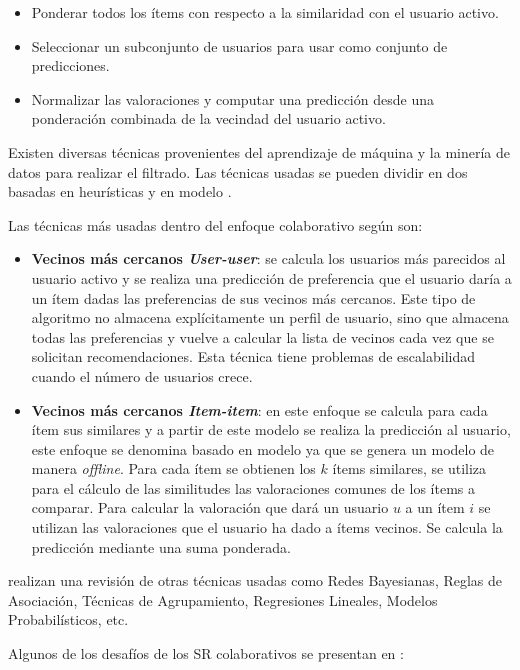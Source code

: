 \begin{itemize}
\item Ponderar todos los ítems con respecto a la similaridad con el usuario activo.
\item Seleccionar un subconjunto de usuarios para usar como conjunto de predicciones.
\item Normalizar las valoraciones y computar una predicción desde una ponderación combinada de la vecindad del usuario activo.
\end{itemize}

Existen diversas técnicas provenientes del aprendizaje de máquina y la minería de datos para realizar el filtrado. Las técnicas usadas se pueden dividir en dos basadas en heurísticas y en modelo \citep{Adomavicius:2005}.

Las técnicas más usadas dentro del enfoque colaborativo según \citep{Bobadilla:2013} son:
\begin{itemize}
\item \textbf{Vecinos más cercanos \textit{User-user}}: se calcula los usuarios más parecidos al usuario activo y se realiza una predicción de preferencia que el usuario daría a un ítem dadas las preferencias de sus vecinos más cercanos. Este tipo de algoritmo no almacena explícitamente un perfil de usuario, sino que almacena todas las preferencias y vuelve a calcular la lista de vecinos cada vez que se solicitan recomendaciones. Esta técnica  tiene problemas de escalabilidad cuando el número de usuarios crece.

\item \textbf{Vecinos más cercanos \textit{Item-item}}: en este enfoque se calcula para cada ítem sus similares y a partir de este modelo se realiza la predicción al usuario, este enfoque se denomina basado en modelo ya que se genera un modelo de manera \textit{offline}. Para cada ítem se obtienen los $k$ ítems similares, se utiliza para el cálculo de las similitudes las valoraciones comunes de los ítems a comparar. Para calcular la valoración que dará un usuario $u$ a un ítem $i$ se utilizan las valoraciones que el usuario ha dado a ítems vecinos. Se calcula la predicción mediante una suma ponderada.
\end{itemize}

\cite{Su:2009} realizan una revisión de otras técnicas usadas como Redes Bayesianas, Reglas de Asociación, Técnicas de Agrupamiento, Regresiones Lineales, Modelos Probabilísticos, etc.

Algunos de los desafíos de los SR colaborativos se presentan en \citep{Su:2009}:

